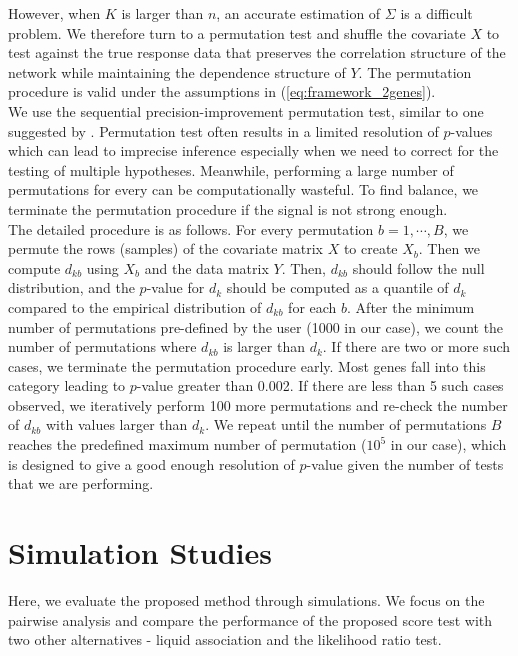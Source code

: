 \documentclass[aap,authoryear, preprint]{imsart}
\numberwithin{equation}{section}
\theoremstyle{plain}
\begin{document}
However, when $K$ is larger than $n$, an accurate estimation of $\Sigma$ is a difficult problem. We therefore turn to a permutation test and shuffle the covariate $X$ to test against the true response data that preserves the correlation structure of the network while maintaining the dependence structure of $Y$. The permutation procedure is valid under the assumptions in (\ref{eq:framework_2genes}). \\

We use the sequential precision-improvement permutation test, similar to one suggested by \cite{chen2012exponential}. Permutation test often results in a limited resolution of $p$-values which can lead to imprecise inference especially when we need to correct for the testing of multiple hypotheses. Meanwhile, performing a large number of permutations for every can be computationally wasteful. To find balance, we terminate the permutation procedure if the signal is not strong enough. \\

The detailed procedure is as follows. For every permutation $b = 1, \cdots, B$, we permute the rows (samples) of the covariate matrix $X$ to create $X_b$. Then we compute $d_{kb}$ using $X_b$ and the data matrix $Y$. Then, $d_{kb}$ should follow the null distribution, and the $p$-value for $d_k$ should be computed as a quantile of $d_k$ compared to the empirical distribution of $d_{kb}$ for each $b$. After the minimum number of permutations pre-defined by the user (1000 in our case), we count the number of permutations where $d_{kb}$ is larger than $d_k$. If there are two or more such cases, we terminate the permutation procedure early. Most genes fall into this category leading to $p$-value greater than 0.002. If there are less than 5 such cases observed, we iteratively perform 100 more permutations and re-check the number of $d_{kb}$ with values larger than $d_k$. We repeat until the number of permutations $B$ reaches the predefined maximum number of permutation ($10^5$ in our case), which is designed to give a good enough resolution of $p$-value given the number of tests that we are performing.

\section{Simulation Studies} \label{simulations}
Here, we evaluate the proposed method through simulations. We focus on the pairwise analysis and compare the performance of the proposed score test with two other alternatives - liquid association and the likelihood ratio test. \\
\end{document}
